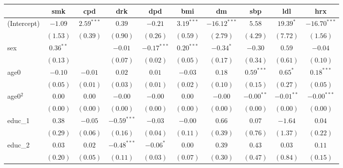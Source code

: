
\begin{tabular}{l c c c c c c c c c}
\toprule
 & smk & cpd & drk & dpd & bmi & dm & sbp & ldl & hrx \\
\midrule
(Intercept)      & $-1.09$       & $2.59^{***}$  & $0.39$        & $-0.21$       & $3.19^{***}$  & $-16.12^{***}$ & $5.58$        & $19.39^{*}$   & $-16.70^{***}$ \\
                 & $(1.53)$      & $(0.39)$      & $(0.90)$      & $(0.26)$      & $(0.59)$      & $(2.79)$       & $(4.29)$      & $(7.72)$      & $(1.56)$       \\
sex              & $0.36^{**}$   &               & $-0.01$       & $-0.17^{***}$ & $0.20^{***}$  & $-0.34^{*}$    & $-0.30$       & $0.59$        & $-0.04$        \\
                 & $(0.13)$      &               & $(0.07)$      & $(0.02)$      & $(0.05)$      & $(0.17)$       & $(0.34)$      & $(0.61)$      & $(0.10)$       \\
age0             & $-0.10$       & $-0.01$       & $0.02$        & $0.01$        & $-0.03$       & $0.18$         & $0.59^{***}$  & $0.65^{*}$    & $0.18^{***}$   \\
                 & $(0.05)$      & $(0.01)$      & $(0.03)$      & $(0.01)$      & $(0.02)$      & $(0.10)$       & $(0.15)$      & $(0.27)$      & $(0.05)$       \\
age0$^2$         & $0.00$        & $0.00$        & $-0.00$       & $-0.00$       & $0.00$        & $-0.00$        & $-0.00^{**}$  & $-0.01^{**}$  & $-0.00^{***}$  \\
                 & $(0.00)$      & $(0.00)$      & $(0.00)$      & $(0.00)$      & $(0.00)$      & $(0.00)$       & $(0.00)$      & $(0.00)$      & $(0.00)$       \\
educ\_1          & $0.38$        & $-0.05$       & $-0.59^{***}$ & $-0.03$       & $-0.00$       & $0.66$         & $0.07$        & $-1.64$       & $0.04$         \\
                 & $(0.29)$      & $(0.06)$      & $(0.16)$      & $(0.04)$      & $(0.11)$      & $(0.39)$       & $(0.76)$      & $(1.37)$      & $(0.22)$       \\
educ\_2          & $0.03$        & $0.02$        & $-0.48^{***}$ & $-0.06^{*}$   & $0.00$        & $0.39$         & $0.43$        & $0.03$        & $0.11$         \\
                 & $(0.20)$      & $(0.05)$      & $(0.11)$      & $(0.03)$      & $(0.07)$      & $(0.30)$       & $(0.47)$      & $(0.84)$      & $(0.15)$       \\

\end{tabular}

